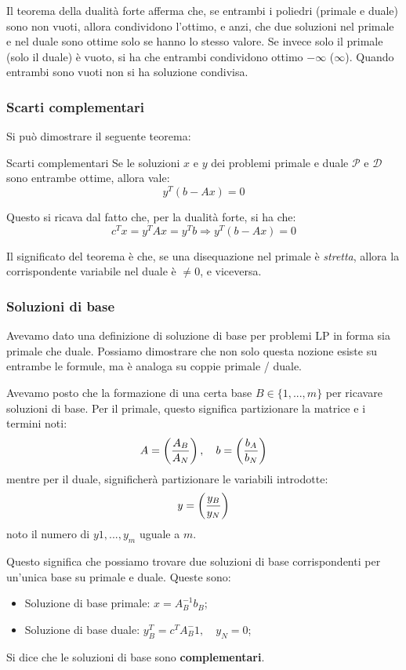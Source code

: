 \documentclass[a4paper,11pt]{article}
\begin{document}
Il teorema della dualità forte afferma che, se entrambi i poliedri (primale e duale) sono non vuoti, allora condividono l'ottimo, e anzi, che due soluzioni nel primale e nel duale sono ottime solo se hanno lo stesso valore.
Se invece solo il primale (solo il duale) è vuoto, si ha che entrambi condividono ottimo $-\infty$ ($\infty$).
Quando entrambi sono vuoti non si ha soluzione condivisa.

\subsubsection{Scarti complementari}
Si può dimostrare il seguente teorema:
\begin{theorem}{Scarti complementari}
	Se le soluzioni $x$ e $y$ dei problemi primale e duale $\mathcal{P}$ e $\mathcal{D}$ sono entrambe ottime, allora vale:
	$$ y^T (b - Ax) = 0 $$
\end{theorem}
Questo si ricava dal fatto che, per la dualità forte, si ha che:
$$
c^T x = y^T Ax = y^T b \Rightarrow y^T(b - Ax) = 0
$$

Il significato del teorema è che, se una disequazione nel primale è \textit{stretta}, allora la corrispondente variabile nel duale è $\neq 0$, e viceversa.

\subsubsection{Soluzioni di base}
Avevamo dato una definizione di soluzione di base per problemi LP in forma sia primale che duale.
Possiamo dimostrare che non solo questa nozione esiste su entrambe le formule, ma è analoga su coppie primale / duale.

Avevamo posto che la formazione di una certa base $B \in \{ 1, ..., m \}$ per ricavare soluzioni di base.
Per il primale, questo significa partizionare la matrice e i termini noti:
$$
A = \left( A_B \over A_N \right), \quad b = \left( b_A \over b_N \right)
$$
mentre per il duale, significherà partizionare le variabili introdotte:
$$
y = \left( y_B \over y_N \right)
$$
noto il numero di $y1, ..., y_m$ uguale a $m$.

Questo significa che possiamo trovare due soluzioni di base corrispondenti per un'unica base su primale e duale.
Queste sono:
\begin{itemize}
	\item Soluzione di base primale: $ x = A_B^{-1} b_B $;
	\item Soluzione di base duale: $ y_B^T = c^T A_B^-1, \quad y_N = 0 $;
\end{itemize}
Si dice che le soluzioni di base sono \textbf{complementari}.
\end{document}
